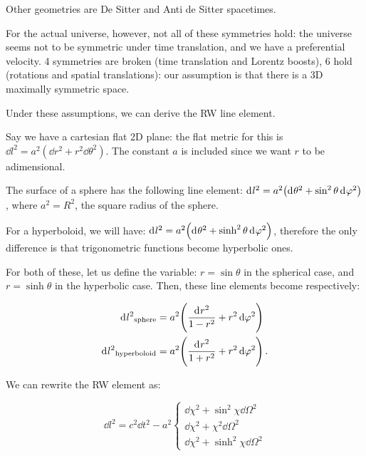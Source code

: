 \documentclass[main.tex]{subfiles}
\begin{document}
Other geometries are De Sitter and Anti de Sitter spacetimes.

For the actual universe, however, not all of these symmetries hold: the universe seems not to be symmetric under time translation, and we have a preferential velocity.
4 symmetries are broken (time translation and Lorentz boosts), 6 hold (rotations and spatial translations): our assumption is that there is a 3D maximally symmetric space.

Under these assumptions, we can derive the RW line element.

Say we have a cartesian flat 2D plane: the flat metric for this is \(\dd{l^2} = a^2 (\dd{r^2} + r^2 \dd{\theta^2}) \).
The constant \(a\) is included since we want \(r\) to be adimensional.

The surface of a sphere has the following line element:
\(\dd[]{l^2} = a^2 \qty(\dd[]{\theta^2} + \sin^2 \theta \dd[]{\varphi^2}) \),
where \(a^2 = R^2\), the square radius of the sphere.

For a hyperboloid, we will have:
\(\dd[]{l^2} = a^2 \qty(\dd[]{\theta^2} + \sinh^2 \theta \dd[]{\varphi^2}) \),
therefore the only difference is that trigonometric functions become hyperbolic ones.

For both of these, let us define the variable: \(r = \sin\theta \) in the spherical case, and \(r = \sinh \theta \)  in the hyperbolic case.
Then, these line elements become respectively:

\begin{subequations}
\begin{align}
    \dd[]{l^2}_{\text{sphere}} &= a^2 \qty(\frac{\dd[]{r^2}}{1 - r^2}  + r^2 \dd{\varphi^2}  )\\
    \dd[]{l^2}_{\text{hyperboloid}} &= a^2 \qty(\frac{\dd[]{r^2}}{1 + r^2} + r^2 \dd{\varphi^2}  )\,.
\end{align}
\end{subequations}

We can rewrite the RW element as:

\begin{equation}
  \dd{l^2} = c^2 \dd{t^2} - a^2 \begin{cases}
      \dd{\chi^2} + \sin^2 \chi \dd{\Omega^2} \\
      \dd{\chi^2} + \chi^2\dd{\Omega^2} \\
      \dd{\chi^2} + \sinh^2 \chi \dd{\Omega^2}
\end{cases}
\end{equation}
\end{document}
